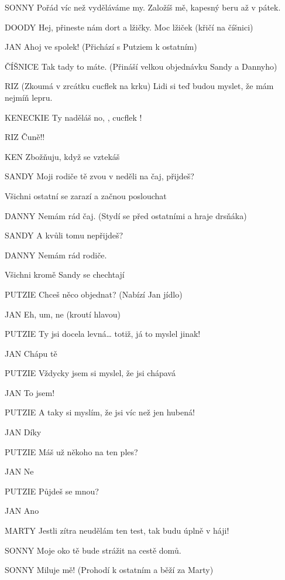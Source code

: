 SONNY        Pořád víc než vyděláváme my. Založíš mě, kapesný beru až v pátek. 

DOODY         Hej, přineste nám dort a  lžičky.  Moc lžiček (křičí na číšnici) 

JAN         Ahoj ve spolek! (Přichází s Putziem k ostatním) 

ČÍŠNICE        Tak tady to máte. (Přináší velkou objednávku Sandy a Dannyho) 

RIZ         (Zkoumá v zrcátku cucflek na krku) Lidi si teď budou myslet, že mám         nejmíň lepru. 

KENECKIE        Ty naděláš no, , cucflek ! 

RIZ                Čuně!! 

KEN        Zbožňuju, když se vztekáš 

SANDY        Moji rodiče tě zvou v neděli na čaj, přijdeš? 

Všichni ostatní se zarazí a začnou poslouchat 

DANNY        Nemám rád čaj. (Stydí se před ostatními a hraje drsňáka) 

SANDY         A kvůli tomu nepřijdeš? 

DANNY        Nemám rád rodiče. 

Všichni kromě Sandy se chechtají 

PUTZIE        Chceš něco objednat? (Nabízí Jan jídlo) 

JAN        Eh, um, ne (kroutí hlavou) 

PUTZIE         Ty jsi docela levná… totiž, já to myslel jinak! 

JAN        Chápu tě 

PUTZIE        Vždycky jsem si myslel, že jsi chápavá 

JAN        To jsem! 

PUTZIE        A taky si myslím, že jsi víc než jen hubená!

JAN        Díky 

PUTZIE         Máš už někoho na ten ples? 

JAN        Ne

PUTZIE        Půjdeš se mnou? 

JAN        Ano 

MARTY        Jestli zítra neudělám ten test, tak budu úplně v háji!

SONNY        Moje oko tě bude strážit na cestě domů. 

SONNY        Miluje mě! (Prohodí k ostatním a běží za Marty) 

